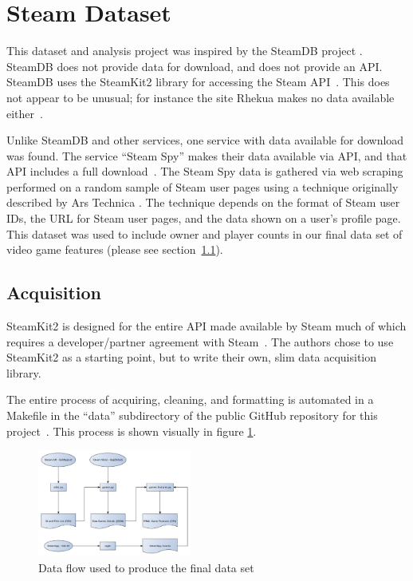 \documentclass[10pt,journal,compsoc]{IEEEtran}
\begin{document}
\section{Steam Dataset}

This dataset and analysis project was inspired by the SteamDB project
\cite{steamdb}. SteamDB does not provide data for download, and does not
provide an API\@. SteamDB uses the SteamKit2 library for accessing the Steam
API~\cite{steamkit,steamdb-faq}. This does not appear to be unusual;
for instance the site Rhekua makes no data available either~\cite{rhekua}.

Unlike SteamDB and other services, one service with data available for
download was found. The service ``Steam Spy'' makes their data available via
API, and that API includes a full download~\cite{steamspy}. The Steam Spy data
is gathered via web scraping performed on a random sample of Steam user pages
using a technique originally described by Ars Technica
\cite{steamspy-about,steamgauge}. The technique depends on the format of Steam
user IDs, the URL for Steam user pages, and the data shown on a user's
profile page. This dataset was used to include owner and player counts in our
final data set of video game features (please see section~\ref{data-grab}).

\subsection{Acquisition}

\label{data-grab}

SteamKit2 is designed for the entire API made available by Steam
much of which requires a developer/partner agreement with
Steam~\cite{steamkit,steam-dev}. The authors chose to use SteamKit2 as a
starting point, but to write their own, slim data acquisition library.

The entire process of acquiring, cleaning, and formatting is automated in a
Makefile in the ``data'' subdirectory of the public GitHub repository for this
project~\cite{our-github}. This process is shown visually in figure
\ref{fig:data-flow}.

\begin{figure}[H]
    \caption{Data flow used to produce the final data set\label{fig:data-flow}}
    \includegraphics[width=0.45\textwidth,keepaspectratio]{data-flow}
\end{figure}
\end{document}
